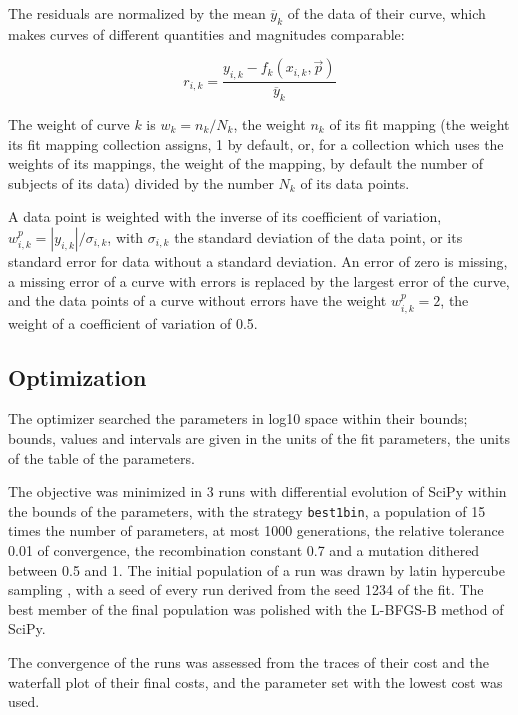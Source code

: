 \documentclass{article}
\begin{document}
The residuals are normalized by the mean $\overline{y}_k$ of the data of their curve, which makes curves of different quantities and magnitudes comparable:

\begin{equation}
r_{i,k} = \frac{y_{i,k} - f_k(x_{i,k}, \vec{p})}{\overline{y}_k}
\end{equation}

The weight of curve $k$ is $w_k = n_k / N_k$, the weight $n_k$ of its fit mapping (the weight its fit mapping collection assigns, 1 by default, or, for a collection which uses the weights of its mappings, the weight of the mapping, by default the number of subjects of its data) divided by the number $N_k$ of its data points.

A data point is weighted with the inverse of its coefficient of variation, $w^{p}_{i,k} = |y_{i,k}| / \sigma_{i,k}$, with $\sigma_{i,k}$ the standard deviation of the data point, or its standard error for data without a standard deviation. An error of zero is missing, a missing error of a curve with errors is replaced by the largest error of the curve, and the data points of a curve without errors have the weight $w^{p}_{i,k} = 2$, the weight of a coefficient of variation of 0.5.

\subsection{Optimization}

The optimizer searched the parameters in log10 space within their bounds; bounds, values and intervals are given in the units of the fit parameters, the units of the table of the parameters.

The objective was minimized in 3 runs with differential evolution \cite{Storn1997} of SciPy \cite{Virtanen2020} within the bounds of the parameters, with the strategy \texttt{best1bin}, a population of 15 times the number of parameters, at most 1000 generations, the relative tolerance 0.01 of convergence, the recombination constant 0.7 and a mutation dithered between 0.5 and 1. The initial population of a run was drawn by latin hypercube sampling \cite{McKay1979}, with a seed of every run derived from the seed 1234 of the fit. The best member of the final population was polished with the L-BFGS-B method of SciPy.

The convergence of the runs was assessed from the traces of their cost and the waterfall plot of their final costs, and the parameter set with the lowest cost was used.
\end{document}
